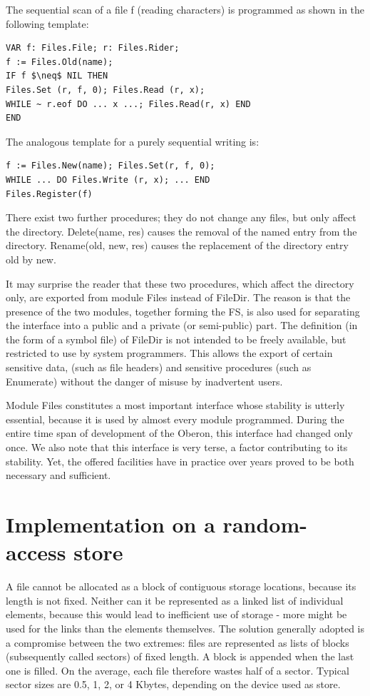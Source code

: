 The sequential scan of a file f (reading characters) is programmed as shown in the following
template:
\begin{verbatim}
VAR f: Files.File; r: Files.Rider;
f := Files.Old(name);
IF f $\neq$ NIL THEN
Files.Set (r, f, 0); Files.Read (r, x);
WHILE ~ r.eof DO ... x ...; Files.Read(r, x) END
END
\end{verbatim}

The analogous template for a purely sequential writing is:
\begin{verbatim}
f := Files.New(name); Files.Set(r, f, 0);
WHILE ... DO Files.Write (r, x); ... END
Files.Register(f)
\end{verbatim}

There exist two further procedures; they do not change any files, but only affect the directory.
Delete(name, res) causes the removal of the named entry from the directory. Rename(old, new,
res) causes the replacement of the directory entry old by new.

It may surprise the reader that these two procedures, which affect the directory only, are exported
from module Files instead of FileDir. The reason is that the presence of the two modules,
together forming the FS, is also used for separating the interface into a public and a
private (or semi-public) part. The definition (in the form of a symbol file) of FileDir is not intended
to be freely available, but restricted to use by system programmers. This allows the export of
certain sensitive data, (such as file headers) and sensitive procedures (such as Enumerate)
without the danger of misuse by inadvertent users.

Module Files constitutes a most important interface whose stability is utterly essential, because it
is used by almost every module programmed. During the entire time span of development of the
Oberon, this interface had changed only once. We also note that this interface is very
terse, a factor contributing to its stability. Yet, the offered facilities have in practice over years
proved to be both necessary and sufficient.

\section{Implementation on a random-access store}
A file cannot be allocated as a block of contiguous storage locations, because its length is not
fixed. Neither can it be represented as a linked list of individual elements, because this would
lead to inefficient use of storage - more might be used for the links than the elements themselves.
The solution generally adopted is a compromise between the two extremes: files are represented
as lists of blocks (subsequently called sectors) of fixed length. A block is appended when the last
one is filled. On the average, each file therefore wastes half of a sector. Typical sector sizes are
0.5, 1, 2, or 4 Kbytes, depending on the device used as store.

